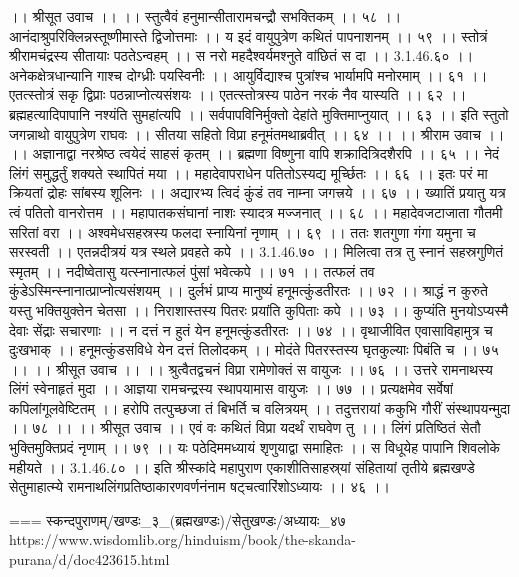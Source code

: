 ।। श्रीसूत उवाच ।। ।।
स्तुत्वैवं हनुमान्सीतारामचन्द्रौ सभक्तिकम् ।। ५८ ।।
आनंदाश्रुपरिक्लिन्नस्तूष्णीमास्ते द्विजोत्तमाः ।।
य इदं वायुपुत्रेण कथितं पापनाशनम् ।। ५९ ।।
स्तोत्रं श्रीरामचंद्रस्य सीतायाः पठतेऽन्वहम् ।।
स नरो महदैश्वर्यमश्नुते वांछितं स दा ।। 3.1.46.६० ।।
अनेकक्षेत्रधान्यानि गाश्च दोग्ध्रीः पयस्विनीः ।।
आयुर्विद्याश्च पुत्रांश्च भार्यामपि मनोरमाम् ।। ६१ ।।
एतत्स्तोत्रं सकृ द्विप्राः पठन्नाप्नोत्यसंशयः ।।
एतत्स्तोत्रस्य पाठेन नरकं नैव यास्यति ।। ६२ ।।
ब्रह्महत्यादिपापानि नश्यंति सुमहांत्यपि ।।
सर्वपापविनिर्मुक्तो देहांते मुक्तिमाप्नुयात् ।। ६३ ।।
इति स्तुतो जगन्नाथो वायुपुत्रेण राघवः ।।
सीतया सहितो विप्रा हनूमंतमथाब्रवीत् ।। ६४ ।।
।। श्रीराम उवाच ।। ।।
अज्ञानाद्वा नरश्रेष्ठ त्वयेदं साहसं कृतम् ।।
ब्रह्मणा विष्णुना वापि शक्रादित्रिदशैरपि ।। ६५ ।।
नेदं लिंगं समुद्धर्तुं शक्यते स्थापितं मया ।।
महादेवापराधेन पतितोऽस्यद्य मूर्च्छितः ।। ६६ ।।
इतः परं मा क्रियतां द्रोहः सांबस्य शूलिनः ।।
अद्यारभ्य त्विदं कुंडं तव नाम्ना जगत्त्रये ।। ६७ ।।
ख्यातिं प्रयातु यत्र त्वं पतितो वानरोत्तम ।।
महापातकसंघानां नाशः स्यादत्र मज्जनात् ।। ६८ ।।
महादेवजटाजाता गौतमी सरितां वरा ।।
अश्वमेधसहस्रस्य फलदा स्नायिनां नृणाम् ।। ६९ ।।
ततः शतगुणा गंगा यमुना च सरस्वती ।।
एतन्नदीत्रयं यत्र स्थले प्रवहते कपे ।। 3.1.46.७० ।।
मिलित्वा तत्र तु स्नानं सहस्रगुणितं स्मृतम् ।।
नदीष्वेतासु यत्स्नानात्फलं पुंसां भवेत्कपे ।। ७१ ।।
तत्फलं तव कुंडेऽस्मिन्स्नानात्प्राप्नोत्यसंशयम् ।।
दुर्लभं प्राप्य मानुष्यं हनूमत्कुंडतीरतः ।। ७२ ।।
श्राद्धं न कुरुते यस्तु भक्तियुक्तेन चेतसा ।।
निराशास्तस्य पितरः प्रयांति कुपिताः कपे ।। ७३ ।।
कुप्यंति मुनयोऽप्यस्मै देवाः सेंद्राः सचारणाः ।।
न दत्तं न हुतं येन हनूमत्कुंडतीरतः ।। ७४ ।।
वृथाजीवित एवासाविहामुत्र च दुःखभाक् ।।
हनूमत्कुंडसविधे येन दत्तं तिलोदकम् ।।
मोदंते पितरस्तस्य घृतकुल्याः पिबंति च ।। ७५ ।।
।। श्रीसूत उवाच ।। ।।
श्रुत्वैतद्वचनं विप्रा रामेणोक्तं स वायुजः ।। ७६ ।।
उत्तरे रामनाथस्य लिंगं स्वेनाहृतं मुदा ।।
आज्ञया रामचन्द्रस्य स्थापयामास वायुजः ।। ७७ ।।
प्रत्यक्षमेव सर्वेषां कपिलांगूलवेष्टितम् ।।
हरोपि तत्पुच्छजा तं बिभर्ति च वलित्रयम् ।।
तदुत्तरायां ककुभि गौरीं संस्थापयन्मुदा ।। ७८ ।।
।। श्रीसूत उवाच ।।
एवं वः कथितं विप्रा यदर्थं राघवेण तु ।।।
लिंगं प्रतिष्ठितं सेतौ भुक्तिमुक्तिप्रदं नृणाम् ।। ७९ ।।
यः पठेदिममध्यायं शृणुयाद्वा समाहितः ।।
स विधूयेह पापानि शिवलोके महीयते ।। 3.1.46.८० ।।
इति श्रीस्कांदे महापुराण एकाशीतिसाहस्र्यां संहितायां तृतीये ब्रह्मखण्डे सेतुमाहात्म्ये रामनाथलिंगप्रतिष्ठाकारणवर्णनंनाम षट्चत्वारिंशोऽध्यायः ।। ४६ ।।

===
स्कन्दपुराणम्/खण्डः_३_(ब्रह्मखण्डः)/सेतुखण्डः/अध्यायः_४७
https://www.wisdomlib.org/hinduism/book/the-skanda-purana/d/doc423615.html

